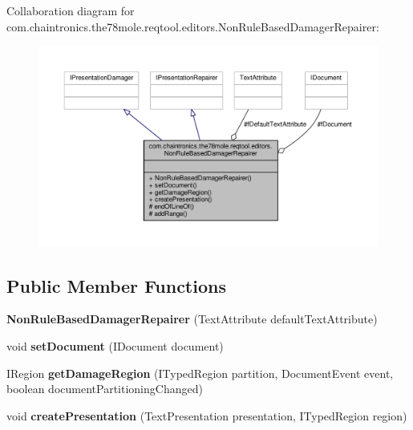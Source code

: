 Collaboration diagram for com.\+chaintronics.\+the78mole.\+reqtool.\+editors.\+Non\+Rule\+Based\+Damager\+Repairer\+:\nopagebreak
\begin{figure}[H]
\begin{center}
\leavevmode
\includegraphics[width=350pt]{d6/de9/classcom_1_1chaintronics_1_1the78mole_1_1reqtool_1_1editors_1_1NonRuleBasedDamagerRepairer__coll__graph}
\end{center}
\end{figure}
\subsection*{Public Member Functions}
\begin{DoxyCompactItemize}
\item 
{\bfseries Non\+Rule\+Based\+Damager\+Repairer} (Text\+Attribute default\+Text\+Attribute)\hypertarget{classcom_1_1chaintronics_1_1the78mole_1_1reqtool_1_1editors_1_1NonRuleBasedDamagerRepairer_acb2650452d412c2367f28fde06d7a0fc}{}\label{classcom_1_1chaintronics_1_1the78mole_1_1reqtool_1_1editors_1_1NonRuleBasedDamagerRepairer_acb2650452d412c2367f28fde06d7a0fc}

\item 
void {\bfseries set\+Document} (I\+Document document)\hypertarget{classcom_1_1chaintronics_1_1the78mole_1_1reqtool_1_1editors_1_1NonRuleBasedDamagerRepairer_ac69c3b0864311d6cd7d5257ac3c9d9fd}{}\label{classcom_1_1chaintronics_1_1the78mole_1_1reqtool_1_1editors_1_1NonRuleBasedDamagerRepairer_ac69c3b0864311d6cd7d5257ac3c9d9fd}

\item 
I\+Region {\bfseries get\+Damage\+Region} (I\+Typed\+Region partition, Document\+Event event, boolean document\+Partitioning\+Changed)\hypertarget{classcom_1_1chaintronics_1_1the78mole_1_1reqtool_1_1editors_1_1NonRuleBasedDamagerRepairer_a8df47e48742130998926b23d7307cf28}{}\label{classcom_1_1chaintronics_1_1the78mole_1_1reqtool_1_1editors_1_1NonRuleBasedDamagerRepairer_a8df47e48742130998926b23d7307cf28}

\item 
void {\bfseries create\+Presentation} (Text\+Presentation presentation, I\+Typed\+Region region)\hypertarget{classcom_1_1chaintronics_1_1the78mole_1_1reqtool_1_1editors_1_1NonRuleBasedDamagerRepairer_a66f92d866aefdc4b3e973204707283e3}{}\label{classcom_1_1chaintronics_1_1the78mole_1_1reqtool_1_1editors_1_1NonRuleBasedDamagerRepairer_a66f92d866aefdc4b3e973204707283e3}

\end{DoxyCompactItemize}
